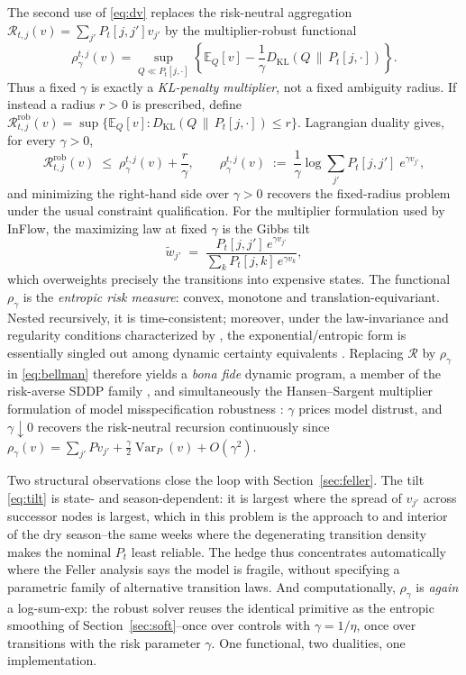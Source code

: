 \documentclass[pdflatex,sn-mathphys-num]{sn-jnl}
\theoremstyle{thmstyleone}
\theoremstyle{thmstyletwo}
\theoremstyle{thmstylethree}
\newcommand{\E}{\mathbb{E}}
\newcommand{\KL}[2]{D_{\mathrm{KL}}\!\left(#1 \,\middle\|\, #2\right)}
\begin{document}
The second use of \eqref{eq:dv} replaces the risk-neutral aggregation
$\mathcal R_{t,j}(v)=\sum_{j'}P_t[j,j']v_{j'}$ by the multiplier-robust
functional
\[
\rho_{\gamma}^{t,j}(v)
=\sup_{Q\ll P_t[j,\cdot]}
\left\{\E_Q[v]-\frac{1}{\gamma}\KL{Q}{P_t[j,\cdot]}\right\}.
\]
Thus a fixed $\gamma$ is exactly a \emph{KL-penalty multiplier}, not a
fixed ambiguity radius. If instead a radius $r>0$ is prescribed, define
$\mathcal R^{\mathrm{rob}}_{t,j}(v)=\sup\{\E_Q[v]:\KL{Q}{P_t[j,\cdot]}\le r\}$.
Lagrangian duality gives, for every $\gamma>0$,
\begin{equation}
\mathcal R^{\mathrm{rob}}_{t,j}(v)
\;\le\;
\rho_{\gamma}^{t,j}(v) + \frac{r}{\gamma},
\qquad
\rho_{\gamma}^{t,j}(v)
\;:=\;
\frac1\gamma \log \sum_{j'} P_t[j,j']\; e^{\gamma v_{j'}},
\label{eq:entropicrisk}
\end{equation}
and minimizing the right-hand side over $\gamma>0$ recovers the
fixed-radius problem under the usual constraint qualification. For the
multiplier formulation used by InFlow, the maximizing law at fixed
$\gamma$ is the Gibbs tilt
\begin{equation}
\tilde w_{j'} \;=\;
\frac{P_t[j,j']\, e^{\gamma v_{j'}}}{\sum_{k} P_t[j,k]\, e^{\gamma v_{k}}},
\label{eq:tilt}
\end{equation}
which overweights precisely the transitions into expensive states. The
functional $\rho_\gamma$ is the \emph{entropic risk measure}: convex,
monotone and translation-equivariant. Nested recursively, it is
time-consistent; moreover, under the law-invariance and regularity
conditions characterized by \citet{kupper2009}, the exponential/entropic
form is essentially singled out among dynamic certainty equivalents
\citep{ruszczynski2010,follmer2016}. Replacing $\mathcal R$ by
$\rho_\gamma$ in \eqref{eq:bellman} therefore yields a \emph{bona fide}
dynamic program, a member of the risk-averse SDDP family
\citep{shapiro2011,philpott2013,dowson2025convex}, and simultaneously the
Hansen--Sargent multiplier formulation of model misspecification robustness
\citep{hansen2008}: $\gamma$ prices model
distrust, and $\gamma \downarrow 0$ recovers the risk-neutral recursion
continuously since $\rho_\gamma(v) = \sum_{j'} P v_{j'} +
\tfrac{\gamma}{2}\operatorname{Var}_P(v) + O(\gamma^2)$.

Two structural observations close the loop with
Section~\ref{sec:feller}. The tilt \eqref{eq:tilt} is state- and
season-dependent: it is largest where the spread of $v_{j'}$ across
successor nodes is largest, which in this problem is the approach to and
interior of the dry season--the same weeks where the degenerating
transition density makes the nominal $P_t$ least reliable. The hedge thus
concentrates automatically where the Feller analysis says the model is
fragile, without specifying a parametric family of alternative transition laws. And computationally,
$\rho_\gamma$ is \emph{again} a log-sum-exp: the robust solver reuses the
identical primitive as the entropic smoothing of
Section~\ref{sec:soft}--once over controls with $\gamma = 1/\eta$, once
over transitions with the risk parameter $\gamma$. One functional, two
dualities, one implementation.
\end{document}
